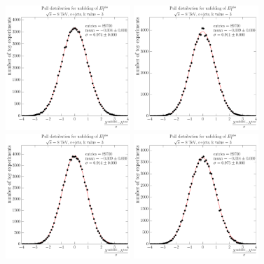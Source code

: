 \begin{figure}[hbtp]
   	\centering
   	\vspace*{-0.8cm}
    \includegraphics[width=0.42\textwidth]{unfolding_performance/pulls/pull_from_files_bin_0_stats_89700} 
    \includegraphics[width=0.42\textwidth]{unfolding_performance/pulls/pull_from_files_bin_1_stats_89700}   \\
    \includegraphics[width=0.42\textwidth]{unfolding_performance/pulls/pull_from_files_bin_2_stats_89700} 
    \includegraphics[width=0.42\textwidth]{unfolding_performance/pulls/pull_from_files_bin_3_stats_89700}   \\

\end{figure}
